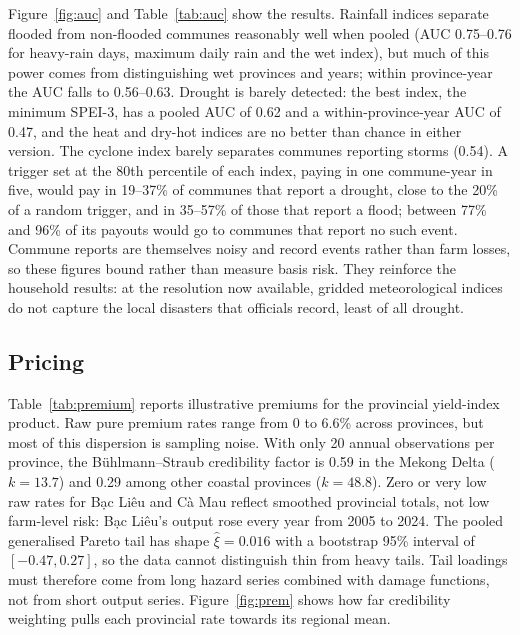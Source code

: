 \documentclass[11pt,a4paper]{article}
\begin{document}
Figure~\ref{fig:auc} and Table~\ref{tab:auc} show the results. Rainfall indices separate flooded from non-flooded communes reasonably well when pooled (AUC 0.75--0.76 for heavy-rain days, maximum daily rain and the wet index), but much of this power comes from distinguishing wet provinces and years; within province-year the AUC falls to 0.56--0.63. Drought is barely detected: the best index, the minimum SPEI-3, has a pooled AUC of 0.62 and a within-province-year AUC of 0.47, and the heat and dry-hot indices are no better than chance in either version. The cyclone index barely separates communes reporting storms (0.54). A trigger set at the 80th percentile of each index, paying in one commune-year in five, would pay in 19--37\% of communes that report a drought, close to the 20\% of a random trigger, and in 35--57\% of those that report a flood; between 77\% and 96\% of its payouts would go to communes that report no such event. Commune reports are themselves noisy and record events rather than farm losses, so these figures bound rather than measure basis risk. They reinforce the household results: at the resolution now available, gridded meteorological indices do not capture the local disasters that officials record, least of all drought.

\subsection{Pricing}

Table~\ref{tab:premium} reports illustrative premiums for the provincial yield-index product. Raw pure premium rates range from 0 to 6.6\% across provinces, but most of this dispersion is sampling noise. With only 20 annual observations per province, the Bühlmann--Straub credibility factor is 0.59 in the Mekong Delta ($k = 13.7$) and 0.29 among other coastal provinces ($k = 48.8$). Zero or very low raw rates for Bạc Liêu and Cà Mau reflect smoothed provincial totals, not low farm-level risk: Bạc Liêu's output rose every year from 2005 to 2024. The pooled generalised Pareto tail has shape $\hat\xi = 0.016$ with a bootstrap 95\% interval of $[-0.47, 0.27]$, so the data cannot distinguish thin from heavy tails. Tail loadings must therefore come from long hazard series combined with damage functions, not from short output series. Figure~\ref{fig:prem} shows how far credibility weighting pulls each provincial rate towards its regional mean.
\end{document}
